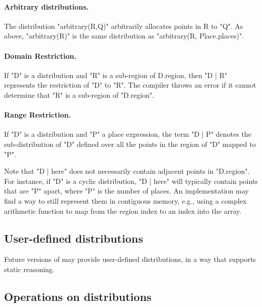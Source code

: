 \paragraph{Arbitrary distributions.} 
The distribution \xcd"arbitrary(R,Q)" arbitrarily allocates points in {\cf
R} to \xcd"Q". As above, \xcd"arbitrary(R)" is the same distribution as
\xcd"arbitrary(R, Place.places)".


\paragraph{Domain Restriction.} 

If \xcd"D" is a distribution and \xcd"R" is a sub-region of {\cf
D.region}, then \xcd"D | R" represents the restriction of \xcd"D" to
\xcd"R".  The compiler throws an error if it cannot determine that
\xcd"R" is a sub-region of \xcd"D.region".

\paragraph{Range Restriction.}

If \xcd"D" is a distribution and \xcd"P" a place expression, the term
\xcd"D | P" denotes the sub-distribution of \xcd"D" defined over all the
points in the region of \xcd"D" mapped to \xcd"P".

Note that \xcd"D | here" does not necessarily contain adjacent points
in \xcd"D.region". For instance, if \xcd"D" is a cyclic distribution,
\xcd"D | here" will typically contain points that are \xcd"P" apart,
where \xcd"P" is the number of places. An implementation may find a
way to still represent them in contiguous memory, e.g., using a
complex arithmetic function to map from the region index to an index
into the array.

\subsection{User-defined distributions}

Future versions of \Xten{} may provide user-defined distributions, in
a way that supports static reasoning.

\subsection{Operations on distributions}

